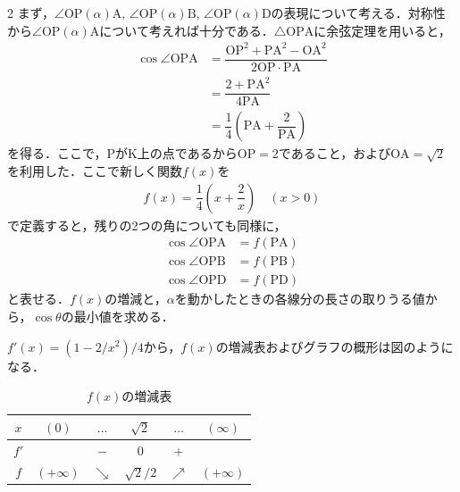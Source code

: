 \documentclass[../../main.tex]{subfiles}
\begin{document}
\begin{multicols}{2}
  まず，$\angle \mathrm{OP}(\alpha)\mathrm{A}$, $\angle \mathrm{OP}(\alpha)\mathrm{B}$, $\angle \mathrm{OP}(\alpha)\mathrm{D}$の表現について考える．対称性から$\angle \mathrm{OP}(\alpha)\mathrm{A}$について考えれば十分である．$\triangle \mathrm{OPA}$に余弦定理を用いると，
  \begin{align}
    \cos \angle \mathrm{OPA}
    & = \dfrac{\mathrm{OP}^2 + \mathrm{PA}^2 - \mathrm{OA}^2}{2 \mathrm{OP} \cdot \mathrm{PA}} \\
    & = \dfrac{2 + \mathrm{PA}^2 }{4\mathrm{PA}}                                               \\
    & = \dfrac{1}{4} \left(\mathrm{PA} + \dfrac{2}{\mathrm{PA}}\right)
  \end{align}
  を得る．ここで，PがK上の点であるから$\mathrm{OP} = 2$であること，および$\mathrm{OA}=\sqrt{2}$を利用した．ここで新しく関数$f(x)$を
  \begin{align}
    f(x) = \dfrac{1}{4}\left(x + \dfrac{2}{x}\right) \quad (x > 0)
  \end{align}
  で定義すると，残りの2つの角についても同様に，
  \begin{align}
    \cos \angle \mathrm{OPA} & = f(\mathrm{PA}) \\
    \cos \angle \mathrm{OPB} & = f(\mathrm{PB}) \\
    \cos \angle \mathrm{OPD} & = f(\mathrm{PD})
  \end{align}
  と表せる．$f(x)$の増減と，$\alpha$を動かしたときの各線分の長さの取りうる値から，$\cos\theta$の最小値を求める．

  $f'(x)=(1-2/x^2)/4$から，$f(x)$の増減表およびグラフの概形は図のようになる．

  \begin{table}[H]
    \centering
    \caption{$f(x)$の増減表}
    \begin{tabular}{|c||c|c|c|c|c|}
      \hline
      $x$  & $(0)$       & $\dots$    & $\sqrt{2}$   & $\dots$    & $(\infty)$  \\
      \hline
      $f'$ &             & $-$        & $0$          & $+$        &             \\
      \hline
      $f$  & $(+\infty)$ & $\searrow$ & $\sqrt{2}/2$ & $\nearrow$ & $(+\infty)$ \\
      \hline
    \end{tabular}
  \end{table}

  \begin{figure}[H]
    \centering
\end{figure}
\end{multicols}
\end{document}
